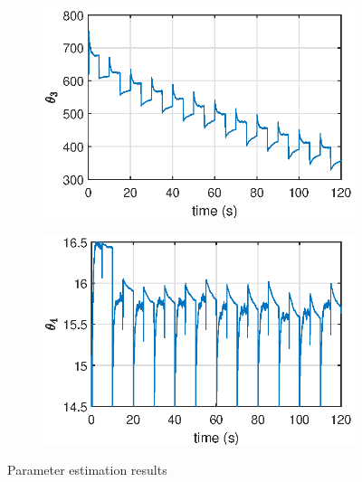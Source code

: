 \begin{figure}[H]
    \begin{minipage}{0.49\textwidth}
        \begin{figure}[H]
            \centering
            \includegraphics[width=\textwidth]{Part2/figs/4_figs/results/th3.eps}
        \end{figure}
    \end{minipage}
    \begin{minipage}{0.49\textwidth}
        \begin{figure}[H]
            \centering
            \includegraphics[width=\textwidth]{Part2/figs/4_figs/results/th4.eps}
        \end{figure}
    \end{minipage}
    \caption{Parameter estimation results}
    \label{fig::param_est}
\end{figure}
